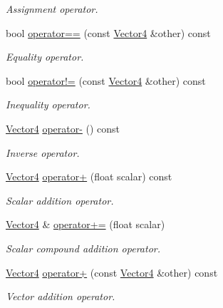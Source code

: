 \begin{DoxyCompactItemize}
\begin{DoxyCompactList}\small\item\em Assignment operator. \end{DoxyCompactList}\item 
bool \hyperlink{classchaos_1_1gfx_1_1_vector4_add5671fb46f71d2196a68e2746309463}{operator==} (const \hyperlink{classchaos_1_1gfx_1_1_vector4}{Vector4} \&other) const 
\begin{DoxyCompactList}\small\item\em Equality operator. \end{DoxyCompactList}\item 
bool \hyperlink{classchaos_1_1gfx_1_1_vector4_ae0ac2f2346e0e56523f8f263286d3954}{operator!=} (const \hyperlink{classchaos_1_1gfx_1_1_vector4}{Vector4} \&other) const 
\begin{DoxyCompactList}\small\item\em Inequality operator. \end{DoxyCompactList}\item 
\hyperlink{classchaos_1_1gfx_1_1_vector4}{Vector4} \hyperlink{classchaos_1_1gfx_1_1_vector4_a214aefd2c36fb704f6a3e9a531e9b4c4}{operator-\/} () const 
\begin{DoxyCompactList}\small\item\em Inverse operator. \end{DoxyCompactList}\item 
\hyperlink{classchaos_1_1gfx_1_1_vector4}{Vector4} \hyperlink{classchaos_1_1gfx_1_1_vector4_aaa1fe6160bb530edada4723daa4276e0}{operator+} (float scalar) const 
\begin{DoxyCompactList}\small\item\em Scalar addition operator. \end{DoxyCompactList}\item 
\hyperlink{classchaos_1_1gfx_1_1_vector4}{Vector4} \& \hyperlink{classchaos_1_1gfx_1_1_vector4_a1ee838a2da3e2595838769850a4a945f}{operator+=} (float scalar)
\begin{DoxyCompactList}\small\item\em Scalar compound addition operator. \end{DoxyCompactList}\item 
\hyperlink{classchaos_1_1gfx_1_1_vector4}{Vector4} \hyperlink{classchaos_1_1gfx_1_1_vector4_ab6631a4c686e6878d8d4212369300372}{operator+} (const \hyperlink{classchaos_1_1gfx_1_1_vector4}{Vector4} \&other) const 
\begin{DoxyCompactList}\small\item\em Vector addition operator. \end{DoxyCompactList}\item 

\end{DoxyCompactItemize}
